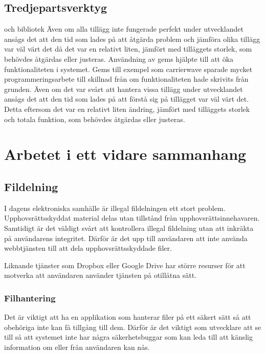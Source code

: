 \subsection{Tredjepartsverktyg}

och bibliotek
Även om alla tillägg inte fungerade perfekt under utvecklandet ansågs det att den tid som lades på att åtgärda problem och jämföra olika tillägg var väl värt det då det var en relativt liten, jämfört med tilläggets storlek, som behövdes åtgärdas eller justeras.   Användning av gems hjälpte till att öka funktionaliteten i systemet. Gems till exempel som carrierwave sparade mycket programmeringsarbete till skillnad från om funktionaliteten hade skrivits från grunden.
Även om det var svårt att hantera vissa tillägg under utvecklandet ansågs det att den tid som lades på att förstå sig på tillägget var väl värt det. Detta eftersom det var en relativt liten ändring, jämfört med tilläggets storlek och totala funktion, som behövdes åtgärdas eller justeras.


\section{Arbetet i ett vidare sammanhang}

\subsection{Fildelning}

I dagens elektroniska samhälle är illegal fildelningen ett stort problem. Upphovsrättsskyddat material delas utan tillstånd från upphovsrättsinnehavaren. Samtidigt är det väldigt svårt att kontrollera illegal fildelning utan att inkräkta på användarens integritet. Därför är det upp till användaren att inte använda webbtjänsten till att dela upphovsrättsskyddade filer.

Liknande tjänster som Dropbox eller Google Drive har större resurser för att motverka att användaren använder tjänsten på otillåtna sätt.

\subsubsection{Filhantering}

Det är viktigt att ha en applikation som hanterar filer på ett säkert sätt så att obehöriga inte kan få tillgång till dem. Därför är det viktigt som utvecklare att se till så att systemet inte har några säkerhetsbuggar som kan leda till att känslig information om eller från användaren kan nås.


